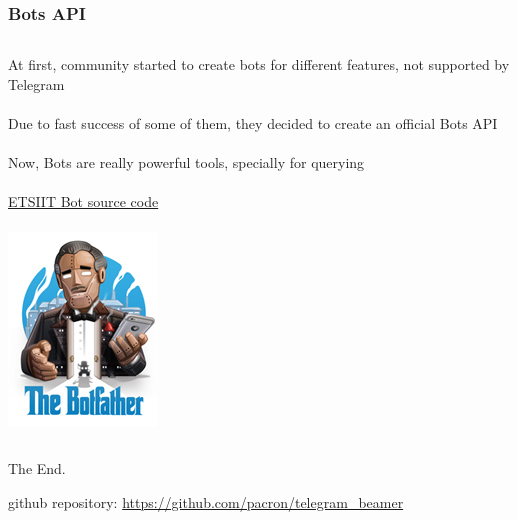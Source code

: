 \documentclass{beamer}
\begin{document}

\begin{frame}
\frametitle{Bots API}
\begin{columns}
At first, community started to create bots for different features, not supported by Telegram\\~\\
Due to fast success of some of them, they decided to create an official Bots API\\~\\
Now, Bots are really powerful tools, specially for querying\\~\\
\href{https://github.com/acasadoquijada/ETSIIT_BOT}{\color{blue}ETSIIT Bot source code}\\~\\
\includegraphics[scale=0.5]{images/botfather}
\end{columns}
\end{frame}


\begin{frame}
\Huge{\centerline{The End.}}
\large{\centerline{github repository: \href{https://github.com/pacron/telegram_beamer}{\color{blue}https://github.com/pacron/telegram\_beamer}}}
\end{frame}

\end{document}
